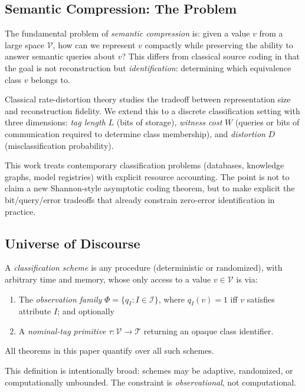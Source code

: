 \subsection{Semantic Compression: The Problem}

The fundamental problem of \emph{semantic compression} is: given a value $v$ from a large space $\mathcal{V}$, how can we represent $v$ compactly while preserving the ability to answer semantic queries about $v$? This differs from classical source coding in that the goal is not reconstruction but \emph{identification}: determining which equivalence class $v$ belongs to.

Classical rate-distortion theory \cite{shannon1959coding} studies the tradeoff between representation size and reconstruction fidelity. We extend this to a discrete classification setting with three dimensions: \emph{tag length} $L$ (bits of storage), \emph{witness cost} $W$ (queries or bits of communication required to determine class membership), and \emph{distortion} $D$ (misclassification probability).

This work treats contemporary classification problems (databases, knowledge graphs, model registries) with explicit resource accounting. The point is not to claim a new Shannon-style asymptotic coding theorem, but to make explicit the bit/query/error tradeoffs that already constrain zero-error identification in practice.

\subsection{Universe of Discourse}

\begin{definition}
A \emph{classification scheme} is any procedure (deterministic or randomized), with arbitrary time and memory, whose only access to a value $v \in \mathcal{V}$ is via:
\begin{enumerate}
\item The \emph{observation family} $\Phi = \{q_I : I \in \mathcal{I}\}$, where $q_I(v) = 1$ iff $v$ satisfies attribute $I$; and optionally
\item A \emph{nominal-tag primitive} $\tau: \mathcal{V} \to \mathcal{T}$ returning an opaque class identifier.
\end{enumerate}
All theorems in this paper quantify over all such schemes.
\end{definition}

This definition is intentionally broad: schemes may be adaptive, randomized, or computationally unbounded. The constraint is \emph{observational}, not computational.

